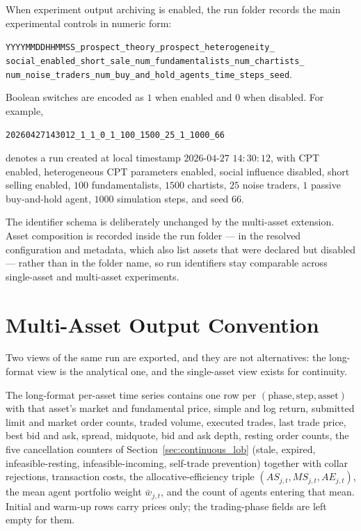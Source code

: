 \documentclass[12pt, a4paper]{article}
\begin{document}
    When experiment output archiving is enabled, the run folder records the main
    experimental controls in numeric form:
    \begin{center}
        \texttt{YYYYMMDDHHMMSS\_prospect\_theory\_prospect\_heterogeneity\_}\\
        \texttt{social\_enabled\_short\_sale\_num\_fundamentalists\_num\_chartists\_}\\
        \texttt{num\_noise\_traders\_num\_buy\_and\_hold\_agents\_time\_steps\_seed}.
    \end{center}
    Boolean switches are encoded as \(1\) when enabled and \(0\) when disabled. For
    example,
    \begin{center}
        \texttt{20260427143012\_1\_1\_0\_1\_100\_1500\_25\_1\_1000\_66}
    \end{center}
    denotes a run created at local timestamp \(2026\)-\(04\)-\(27\) \(14{:}30{:}12\),
    with CPT enabled, heterogeneous CPT parameters enabled, social influence
    disabled, short selling enabled, \(100\) fundamentalists, \(1500\) chartists,
    \(25\) noise traders, \(1\) passive buy-and-hold agent, \(1000\) simulation
    steps, and seed \(66\).

    The identifier schema is deliberately unchanged by the multi-asset extension.
    Asset composition is recorded inside the run folder --- in the resolved
    configuration and metadata, which also list assets that were declared but
    disabled --- rather than in the folder name, so run identifiers stay
    comparable across single-asset and multi-asset experiments.

    \section{Multi-Asset Output Convention}\label{sec:multi_asset_outputs}

    Two views of the same run are exported, and they are not alternatives: the
    long-format view is the analytical one, and the single-asset view exists for
    continuity.

    The long-format per-asset time series contains one row per
    \((\text{phase},\text{step},\text{asset})\) with that asset's market and
    fundamental price, simple and log return, submitted limit and market order
    counts, traded volume, executed trades, last trade price, best bid and ask,
    spread, midquote, bid and ask depth, resting order counts, the five
    cancellation counters of Section~\ref{sec:continuous_lob} (stale, expired,
    infeasible-resting, infeasible-incoming, self-trade prevention) together with
    collar rejections, transaction costs, the allocative-efficiency triple
    \((AS_{j,t},MS_{j,t},AE_{j,t})\), the mean agent portfolio weight
    \(\bar w_{j,t}\), and the count of agents entering that mean. Initial and
    warm-up rows carry prices only; the trading-phase fields are left empty for
    them.
\end{document}
